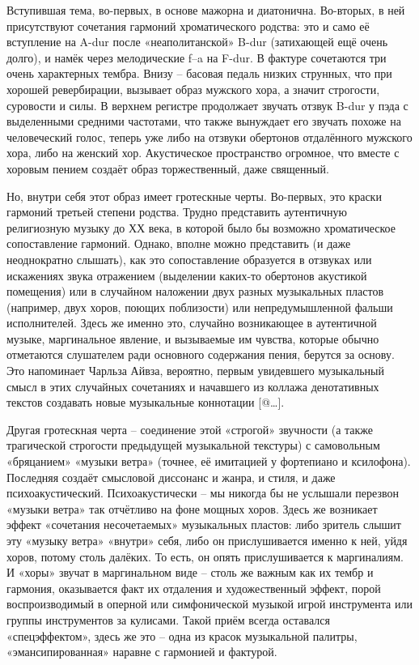 Вступившая тема, во-первых, в основе мажорна и диатонична.
Во-вторых, в ней присутствуют сочетания гармоний хроматического родства: это и само её вступление на A-dur после «неаполитанской» B-dur (затихающей ещё очень долго), и намёк через мелодические f--a на F-dur.
В фактуре сочетаются три очень характерных тембра.
Внизу -- басовая педаль низких струнных, что при хорошей ревербирации, вызывает образ мужского хора, а значит строгости, суровости и силы.
В верхнем регистре продолжает звучать отзвук B-dur у пэда с выделенными средними частотами, что также вынуждает его звучать похоже на человеческий голос, теперь уже либо на отзвуки обертонов отдалённого мужского хора, либо на женский хор.
Акустическое пространство огромное, что вместе с хоровым пением создаёт образ торжественный, даже священный.

Но, внутри себя этот образ имеет гротескные черты.
Во-первых, это краски гармоний третьей степени родства.
Трудно представить аутентичную религиозную музыку до ХХ века, в которой было бы возможно хроматическое сопоставление гармоний.
Однако, вполне можно представить (и даже неоднократно слышать), как это сопоставление образуется в отзвуках или искажениях звука отражением (выделении каких-то обертонов акустикой помещения) или в случайном наложении двух разных музыкальных пластов (например, двух хоров, поющих поблизости) или непредумышленной фальши исполнителей.
Здесь же именно это, случайно возникающее в аутентичной музыке, маргинальное явление, и вызываемые им чувства, которые обычно отметаются слушателем ради основного содержания пения, берутся за основу.
Это напоминает Чарльза Айвза, вероятно, первым увидевшего музыкальный смысл в этих случайных сочетаниях и начавшего из коллажа денотативных текстов создавать новые музыкальные коннотации {[}@\ldots{}{]}.

Другая гротескная черта -- соединение этой «строгой» звучности (а также трагической строгости предыдущей музыкальной текстуры) с самовольным «бряцанием» «музыки ветра» (точнее, её имитацией у фортепиано и ксилофона).
Последняя создаёт смысловой диссонанс и жанра, и стиля, и даже психоакустический.
Психоакустически -- мы никогда бы не услышали перезвон «музыки ветра» так отчётливо на фоне мощных хоров.
Здесь же возникает эффект «сочетания несочетаемых» музыкальных пластов: либо зритель слышит эту «музыку ветра» «внутри» себя, либо он прислушивается именно к ней, уйдя хоров, потому столь далёких.
То есть, он опять прислушивается к маргиналиям.
И «хоры» звучат в маргинальном виде -- столь же важным как их тембр и гармония, оказывается факт их отдаления и художественный эффект, порой воспроизводимый в оперной или симфонической музыкой игрой инструмента или группы инструментов за кулисами.
Такой приём всегда оставался «спецэффектом», здесь же это -- одна из красок музыкальной палитры, «эмансипированная» наравне с гармонией и фактурой.

